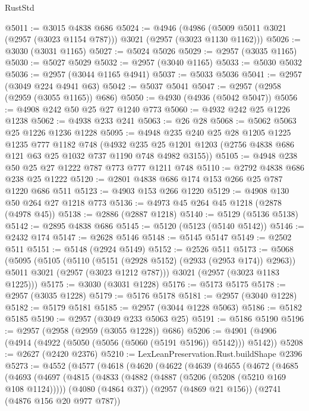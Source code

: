 \begin{lexlean}{RustStd}
\begin{coremodule}
@5011 := @3015 @4838 @686
@5024 := @4946
    (@4986 (@5009 @5011 @3021 (@2957 (@3023 @1154 @787))) @3021 (@2957 (@3023 @1130 @1162)))
@5026 := @3030 (@3031 @1165)
@5027 := @5024 @5026
@5029 := @2957 (@3035 @1165)
@5030 := @5027 @5029
@5032 := @2957 (@3040 @1165)
@5033 := @5030 @5032
@5036 := @2957 (@3044 @1165 @4941)
@5037 := @5033 @5036
@5041 := @2957 (@3049 @224 @4941 @63)
@5042 := @5037 @5041
@5047 := @2957 (@2958 (@2959 (@3055 @1165)) @686)
@5050 := @4930 (@4936 (@5042 @5047))
@5056 := @4908 @242 @50 @25 @27 @1240 @773
@5060 := @4932 @242 @25 @1226 @1238
@5062 := @4938 @233 @241
@5063 := @26 @28
@5068 := @5062 @5063 @25 @1226 @1236 @1228
@5095 := @4948
    @235
    @240
    @25
    @28
    @1205
    @1225
    @1235
    @777
    @1182
    @748
    (@4932 @235 @25 @1201 @1203 (@2756 @4838 @686 @121 @63 @25 @1032 @737 @1190 @748 @4982 @3155))
@5105 := @4948 @238 @50 @25 @27 @1222 @787 @773 @777 @1211 @748
@5110 := @2792 @4838 @686 @238 @25 @1222
@5120 := @2801 @4838 @686 @174 @153 @266 @25 @787 @1220 @686 @511
@5123 := @4903 @153 @266 @1220
@5129 := @4908 @130 @50 @264 @27 @1218 @773
@5136 := @4973 @45 @264 @45 @1218 (@2878 (@4978 @45))
@5138 := @2886 (@2887 @1218)
@5140 := @5129 (@5136 @5138)
@5142 := @2895 @4838 @686
@5145 := @5120 (@5123 (@5140 @5142))
@5146 := @2432 @174
@5147 := @2628 @5146
@5148 := @5145 @5147
@5149 := @2502 @511
@5151 := @5148 (@2924 @5149)
@5152 := @2526 @511
@5173 := @5068
    (@5095
      (@5105
        (@5110 (@5151 (@2928 @5152) (@2933 (@2953 @174)) @2963))
        @5011
        @3021
        (@2957 (@3023 @1212 @787)))
      @3021
      (@2957 (@3023 @1183 @1225)))
@5175 := @3030 (@3031 @1228)
@5176 := @5173 @5175
@5178 := @2957 (@3035 @1228)
@5179 := @5176 @5178
@5181 := @2957 (@3040 @1228)
@5182 := @5179 @5181
@5185 := @2957 (@3044 @1228 @5063)
@5186 := @5182 @5185
@5190 := @2957 (@3049 @233 @5063 @25)
@5191 := @5186 @5190
@5196 := @2957 (@2958 (@2959 (@3055 @1228)) @686)
@5206 := @4901 (@4906 (@4914 (@4922 (@5050 (@5056 (@5060 (@5191 @5196)) @5142))) @5142))
@5208 := @2627 (@2420 @2376)
@5210 := LexLeanPreservation.Rust.buildShape @2396
@5273 := @4552
    (@4577
      (@4618
        (@4620
          (@4622
            (@4639
              (@4655
                (@4672
                  (@4685
                    (@4693
                      (@4697
                        (@4815
                          (@4833
                            (@4882 (@4887 (@5206 (@5208 (@5210 @169 @108 @1124)))))
                            (@4080 (@4864 @37))
                            (@2957 (@4869 @21 @156))
                            (@2741 (@4876 @156 @20 @977 @787))

\end{coremodule}
\end{lexlean}
